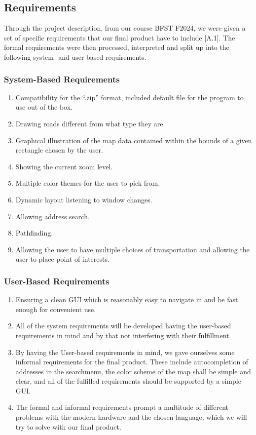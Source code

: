 \subsection{Requirements} \label{Introduction/Requirements}
Through the project description, from our course BFST F2024, we were given a set of specific requirements that our final product have to include [A.1].
The formal requirements were then processed, interpreted and split up into the following system- and user-based requirements.
\subsubsection{System-Based Requirements}
\begin{enumerate}
\setlength{\itemsep}{0.1em}
    \item Compatibility for the “.zip” format, included default file for the program to use out of the box.
    \item Drawing roads different from what type they are.
    \item Graphical illustration of the map data contained within the bounds of a given rectangle chosen by the user.
    \item Showing the current zoom level.
    \item Multiple color themes for the user to pick from.
    \item Dynamic layout listening to window changes.
    \item Allowing address search.
    \item Pathfinding.
    \item Allowing the user to have multiple choices of transportation and allowing the user to place point of interests.
\end{enumerate}
\newpage
\subsubsection{User-Based Requirements}
\begin{enumerate}
    \setlength{\itemsep}{0.1em}
    \item Ensuring a clean GUI which is reasonably easy to navigate in and be fast enough for convenient use. 
    \item All of the system requirements will be developed having the user-based requirements in mind and by that not interfering with their fulfillment.
    \item By having the User-based requirements in mind, we gave ourselves some informal requirements for the final product. These include autocompletion of addresses in the searchmenu, the color scheme of the map shall be simple and clear, and all of the fulfilled requirements should be supported by a simple GUI.
    \item The formal and informal requirements prompt a multitude of different problems with the modern hardware and the chosen language, which we will try to solve with our final product.
\end{enumerate}


